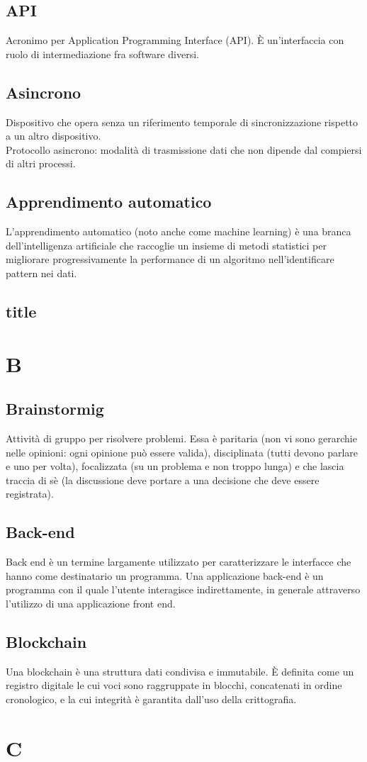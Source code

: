 \subsection{API} Acronimo per Application Programming Interface (API). È un'interfaccia con ruolo di intermediazione fra software diversi.
\subsection{Asincrono} Dispositivo che opera senza un riferimento temporale di sincronizzazione rispetto a un altro dispositivo.\\
Protocollo asincrono: modalità di trasmissione dati che non dipende dal compiersi di altri processi.
\subsection{Apprendimento automatico} L’apprendimento automatico (noto anche come machine learning) è una branca dell'intelligenza artificiale che raccoglie un insieme di metodi statistici per migliorare progressivamente la performance di un algoritmo nell'identificare pattern nei dati.
\subsection{title}
\newpage \section{B}
\subsection{Brainstormig} Attività di gruppo per risolvere problemi. Essa è paritaria (non vi sono gerarchie nelle opinioni: ogni opinione può essere valida), disciplinata (tutti devono parlare e uno per volta), focalizzata (su un problema e non troppo lunga) e che lascia traccia di sè (la discussione deve portare a una decisione che deve essere registrata).
\subsection{Back-end} Back end è un termine largamente utilizzato per caratterizzare le interfacce che hanno come destinatario un programma. Una applicazione back-end è un programma con il quale l'utente interagisce indirettamente, in generale attraverso l'utilizzo di una applicazione front end.
\subsection{Blockchain} Una blockchain è una struttura dati condivisa e immutabile. È definita come un registro
digitale le cui voci sono raggruppate in blocchi, concatenati in ordine cronologico, e la cui integrità è garantita dall'uso della crittografia.
\newpage \section{C}
